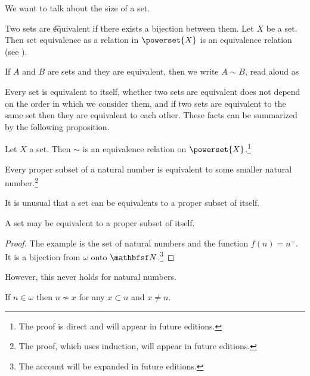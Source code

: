 

We want to talk about the size of a set.


Two sets are \t{equivalent} if there exists a bijection between them.
Let $X$ be a set.
Then set equivalence as a relation in $\powerset{X}$ is an equivalence relation (see ).


If $A$ and $B$ are sets and they are equivalent, then we write $A \sim B$, read aloud as 


Every set is equivalent to itself, whether two sets are equivalent does not depend on the order in which we consider them, and if two sets are equivalent to the same set then they are equivalent to each other.
These facts can be summarized by the following proposition.

\begin{proposition}
	Let $X$ a set. Then $\sim$ is an equivalence relation on $\powerset{X}$.\footnote{The proof is direct and will appear in future editions.}
\end{proposition}


\begin{proposition}
	Every proper subset of a natural number is equivalent to some smaller natural number.\footnote{The proof, which uses induction, will appear in future editions.}
\end{proposition}


It is unusual that a set can be equivalents to a proper subset of itself.

\begin{proposition}
	A set may be equivalent to a proper subset of itself.
\end{proposition}
\begin{proof}
The example is the set of natural numbers and the function $f(n) = n^+$.
It is a bijection from $\omega$ onto $\N$.\footnote{The account will be expanded in future editions.}
\end{proof}
However, this never holds for natural numbers.
\begin{proposition}
	If $n \in \omega$ then $n \not\sim x$ for any $x \subset n$ and $x \neq n$.
\end{proposition}

